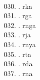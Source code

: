 \begin{tabbing}
\egroup  \\
030.	. 	\> rka 	\> \bgroup\tibetan \def\u#1{\vtop{\baselineskip0pt\hbox{#1}\hbox{\tibsp\char123}}}\parindent=0pt \newbox\fillerbox\setbox\fillerbox\hbox{\vrule height0.4cm depth0.4cm width0pt}\def\filler{\copy\fillerbox}\filler\tibsp{}\tenrm\ \tibetan
\egroup  \\
031.	. 	\> rga 	\> \bgroup\tibetan \def\u#1{\vtop{\baselineskip0pt\hbox{#1}\hbox{\tibsp\char123}}}\parindent=0pt \newbox\fillerbox\setbox\fillerbox\hbox{\vrule height0.4cm depth0.4cm width0pt}\def\filler{\copy\fillerbox}\filler\tibsp{}\tenrm\ \tibetan
\egroup  \\
032.	. 	\> rnga 	\> \bgroup\tibetan \def\u#1{\vtop{\baselineskip0pt\hbox{#1}\hbox{\tibsp\char123}}}\parindent=0pt \newbox\fillerbox\setbox\fillerbox\hbox{\vrule height0.4cm depth0.4cm width0pt}\def\filler{\copy\fillerbox}\filler\tibsp{}\tenrm\ \tibetan
\egroup  \\
033.	. 	\> rja 	\> \bgroup\tibetan \def\u#1{\vtop{\baselineskip0pt\hbox{#1}\hbox{\tibsp\char123}}}\parindent=0pt \newbox\fillerbox\setbox\fillerbox\hbox{\vrule height0.4cm depth0.4cm width0pt}\def\filler{\copy\fillerbox}\filler\tibsp{}\tenrm\ \tibetan
\egroup  \\
034.	. 	\> rnya 	\> \bgroup\tibetan \def\u#1{\vtop{\baselineskip0pt\hbox{#1}\hbox{\tibsp\char123}}}\parindent=0pt \newbox\fillerbox\setbox\fillerbox\hbox{\vrule height0.4cm depth0.4cm width0pt}\def\filler{\copy\fillerbox}\filler\tibsp{}\tenrm\ \tibetan
\egroup  \\
035.	. 	\> rta 	\> \bgroup\tibetan \def\u#1{\vtop{\baselineskip0pt\hbox{#1}\hbox{\tibsp\char123}}}\parindent=0pt \newbox\fillerbox\setbox\fillerbox\hbox{\vrule height0.4cm depth0.4cm width0pt}\def\filler{\copy\fillerbox}\filler\tibsp{}\tenrm\ \tibetan
\egroup  \\
036.	. 	\> rda 	\> \bgroup\tibetan \def\u#1{\vtop{\baselineskip0pt\hbox{#1}\hbox{\tibsp\char123}}}\parindent=0pt \newbox\fillerbox\setbox\fillerbox\hbox{\vrule height0.4cm depth0.4cm width0pt}\def\filler{\copy\fillerbox}\filler\tibsp{}\tenrm\ \tibetan
\egroup  \\
037.	. 	\> rna 	\> \bgroup\tibetan \def\u#1{\vtop{\baselineskip0pt\hbox{#1}\hbox{\tibsp\char123}}}\parindent=0pt \newbox\fillerbox\setbox\fillerbox\hbox{\vrule height0.4cm depth0.4cm width0pt}\def\filler{\copy\fillerbox}\filler\tibsp{}\tenrm\ \tibetan

\end{tabbing}
